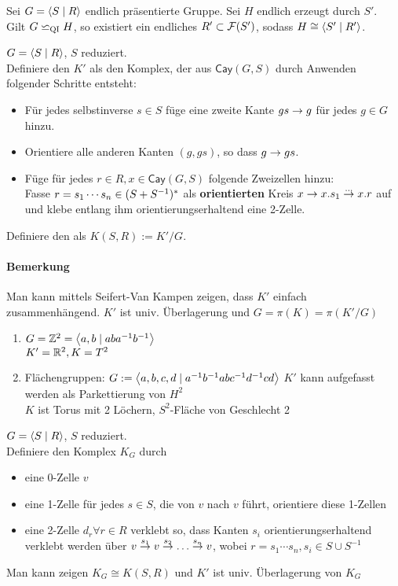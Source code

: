 \documentclass{article}
\newcommand{\qi}{\backsimeq_{\textsc{QI}}}
\newcommand{\tm}{\subset}
\newcommand{\Cay}[2]{\textsf{Cay}(#1,#2)}
\begin{document}
Sei $G = \grp{S}{R}$ endlich präsentierte Gruppe. Sei $H$ endlich erzeugt durch $S'$.\\
Gilt $G \qi H$, so existiert ein endliches $R' \tm \F(S')$, sodass $H \isom{} \grp{S'}{R'}$.

$G = \grp{S}{R}$, $S$ reduziert.\\
Definiere den  $K'$ als den Komplex, der aus $\Cay{G}{S}$ durch Anwenden folgender Schritte entsteht:
\begin{itemize}
\item Für jedes selbstinverse $s\in S$ füge eine zweite Kante $gs \overset{}{\rightarrow} g$ für jedes $g \in G$ hinzu.
\item Orientiere alle anderen Kanten $(g, gs)$, so dass $g \overset{}{\rightarrow} gs$.
\item Füge für jedes $r \in R, x \in \Cay{G}{S}$ folgende Zweizellen hinzu:\\
Fasse $r = s_1\cdots s_n \in (S + S^{-1})^*$ als \textbf{orientierten} Kreis $x \overset{}{\rightarrow} x.s_1 \overset{\ldots}{\rightarrow} x.r$ auf und klebe entlang ihm orientierungserhaltend eine 2-Zelle.
\end{itemize}
Definiere den  als $K(S,R) := K' / G$.

\paragraph{Bemerkung}
Man kann mittels Seifert-Van Kampen zeigen, dass $K'$ einfach zusammenhängend. $K'$ ist univ. Überlagerung und $G = \pi(K) = \pi(K'/G)$

\Bem{}

\begin{enumerate}
	\item $G = \Z^2 = \grp{a,b}{aba^{-1}b^{-1}}$\\
		$K' = \mathbb{R}^2, K = T^2$
	\item Flächengruppen: $G:=\grp{a,b,c,d}{a^{-1}b^{-1}abc^{-1}d^{-1}cd }$
	$K'$ kann aufgefasst werden als Parkettierung von $H^2$\\
	$K$ ist Torus mit 2 Löchern, $S^2$-Fläche von Geschlecht 2
\end{enumerate}

$G = \grp{S}{R}$, $S$ reduziert.\\
Definiere den Komplex $K_G$ durch
\begin{itemize}
	\item eine 0-Zelle $v$
	\item eine 1-Zelle für jedes $s \in S$, die von $v$ nach $v$ führt, orientiere diese 1-Zellen
	\item eine 2-Zelle $d_r \forall r \in R$ verklebt so, dass Kanten $s_i$ orientierungserhaltend verklebt werden über $v \overset{s_1}{\rightarrow}  v \overset{s_2}{\rightarrow}  \ldots \overset{s_n}{\rightarrow} v$, wobei $r = s_1\cdots s_n, s_i \in S\cup S^{-1}$
\end{itemize}
Man kann zeigen $K_G \cong K(S,R)$ und $K'$ ist univ. Überlagerung von $K_G$
\end{document}
